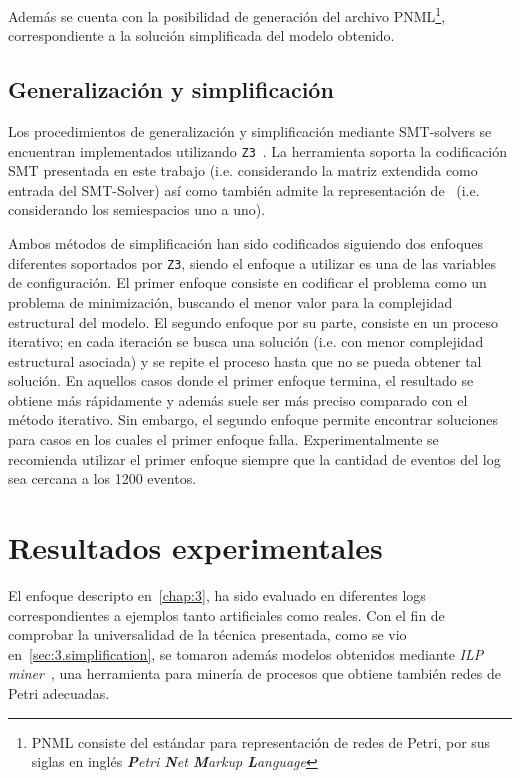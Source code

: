 Además se cuenta con la posibilidad de generación del archivo PNML\footnote{PNML consiste del estándar para representación
de redes de Petri, por sus siglas en inglés \textit{\textbf{P}etri \textbf{N}et \textbf{M}arkup \textbf{L}anguage}},
correspondiente a la solución simplificada del modelo obtenido.

\subsection{Generalización y simplificación}
\label{sec:4.simplification}

Los procedimientos de generalización y simplificación mediante SMT-solvers se encuentran implementados utilizando \texttt{Z3}~\cite{MouraB08}. 
La herramienta soporta la codificación SMT presentada en este trabajo (i.e. considerando la matriz extendida
como entrada del SMT-Solver) así como también admite la representación de~\cite{LeonCB15} (i.e. considerando los semiespacios uno a uno).

Ambos métodos de simplificación han sido codificados siguiendo dos enfoques diferentes soportados por \texttt{Z3},
siendo el enfoque a utilizar es una de las variables de configuración.
El primer enfoque consiste en codificar el problema como un problema de minimización, buscando 
el menor valor para la complejidad estructural del modelo.
El segundo enfoque por su parte, consiste en un proceso iterativo; en cada iteración se busca
una  solución (i.e. con menor complejidad estructural asociada) y se repite el proceso
hasta que no se pueda obtener tal solución.
En aquellos casos donde el primer enfoque termina, el resultado se obtiene más rápidamente y además 
suele ser más preciso comparado con el método iterativo. Sin embargo, el segundo enfoque
permite encontrar soluciones para casos en los cuales el primer enfoque falla.
Experimentalmente se recomienda utilizar el primer enfoque siempre que la cantidad de eventos del log
sea cercana a los 1200 eventos.

\section{Resultados experimentales}
\label{sec:4.experiments}

El enfoque descripto en~\autoref{chap:3}, ha sido evaluado en diferentes logs correspondientes
a ejemplos tanto artificiales como reales. Con el fin de comprobar la universalidad de la técnica presentada,
como se vio en~\autoref{sec:3.simplification}, se tomaron además modelos obtenidos mediante \textit{ILP miner}~\cite{WDHS08},
una herramienta para minería de procesos que obtiene también redes de Petri adecuadas.

